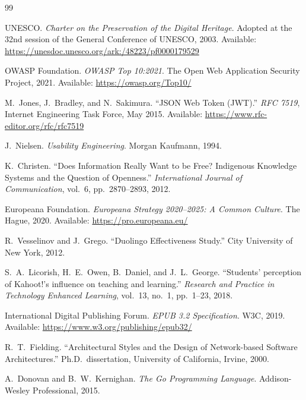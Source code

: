 \documentclass[12pt,a4paper]{report}
\begin{document}
\begin{thebibliography}{99}

UNESCO. \textit{Charter on the Preservation of the Digital Heritage}.
Adopted at the 32nd session of the General Conference of UNESCO,
2003. Available:
\url{https://unesdoc.unesco.org/ark:/48223/pf0000179529}

OWASP Foundation. \textit{OWASP Top 10:2021}. The Open Web Application
Security Project, 2021. Available: \url{https://owasp.org/Top10/}

M.~Jones, J.~Bradley, and N.~Sakimura. ``JSON Web Token (JWT).''
\textit{RFC 7519}, Internet Engineering Task Force, May 2015.
Available: \url{https://www.rfc-editor.org/rfc/rfc7519}

J.~Nielsen. \textit{Usability Engineering}. Morgan Kaufmann, 1994.

K.~Christen. ``Does Information Really Want to be Free? Indigenous
Knowledge Systems and the Question of Openness.''
\textit{International Journal of Communication}, vol.~6, pp.~2870--2893,
2012.

Europeana Foundation. \textit{Europeana Strategy 2020--2025: A
Common Culture}. The Hague, 2020. Available:
\url{https://pro.europeana.eu/}

R.~Vesselinov and J.~Grego. ``Duolingo Effectiveness Study.''
City University of New York, 2012.

S.~A.~Licorish, H.~E.~Owen, B.~Daniel, and J.~L.~George. ``Students'
perception of Kahoot!'s influence on teaching and learning.''
\textit{Research and Practice in Technology Enhanced Learning},
vol.~13, no.~1, pp.~1--23, 2018.

International Digital Publishing Forum. \textit{EPUB 3.2
Specification}. W3C, 2019. Available:
\url{https://www.w3.org/publishing/epub32/}

R.~T.~Fielding. ``Architectural Styles and the Design of
Network-based Software Architectures.'' Ph.D.\ dissertation,
University of California, Irvine, 2000.

A.~Donovan and B.~W.~Kernighan. \textit{The Go Programming Language}.
Addison-Wesley Professional, 2015.


\end{thebibliography}
\end{document}
